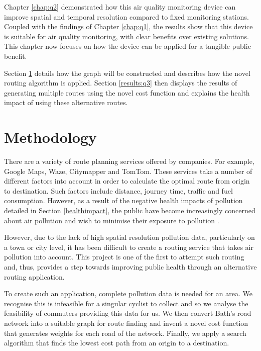 \documentclass[11pt,twosided,a4paper]{report}
\begin{document}
Chapter \ref{chap:q2} demonstrated how this air quality monitoring device can improve spatial and temporal resolution compared to fixed monitoring stations. Coupled with the findings of Chapter \ref{chap:q1}, the results show that this device is suitable for air quality monitoring, with clear benefits over existing solutions. This chapter now focuses on how the device can be applied for a tangible public benefit.

Section \ref{meth:q3} details how the graph will be constructed and describes how the novel routing algorithm is applied. Section \ref{results:q3} then displays the results of generating multiple routes using the novel cost function and explains the health impact of using these alternative routes.

\section{Methodology} \label{meth:q3}

There are a variety of route planning services offered by companies. For example, Google Maps, Waze, Citymapper and TomTom. These services take a number of different factors into account in order to calculate the optimal route from origin to destination. Such factors include distance, journey time, traffic and fuel consumption. However, as a result of the negative health impacts of pollution detailed in Section \ref{healthimpact}, the public have become increasingly concerned about air pollution and wish to minimise their exposure to pollution \citep{hartog2010health}.

However, due to the lack of high spatial resolution pollution data, particularly on a town or city level, it has been difficult to create a routing service that takes air pollution into account. This project is one of the first to attempt such routing \citep{sharker2014exposureroutes, Hasenfratz2015highresmapsTram} and, thus, provides a step towards improving public health through an alternative routing application.

To create such an application, complete pollution data is needed for an area. We recognise this is infeasible for a singular cyclist to collect and so we analyse the feasibility of commuters providing this data for us. We then convert Bath's road network into a suitable graph for route finding and invent a novel cost function that generates weights for each road of the network. Finally, we apply a search algorithm that finds the lowest cost path from an origin to a destination. 
\end{document}
